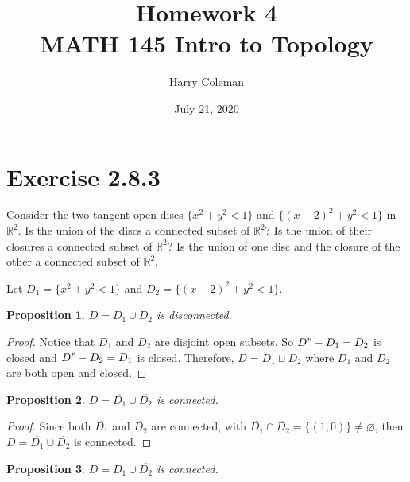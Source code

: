 \documentclass[12pt]{article}
\newtheorem{proposition}{Proposition}
\newenvironment{problem}
    {\begin{lrbox}{\mybox}\begin{minipage}{\textwidth-10pt}}
    {\end{minipage}\end{lrbox}\framebox[6.5in]{\usebox{\mybox}}}
\newcommand{\clo}[1]{\overline{#1}}
\newcommand{\R}{\mathbb{R}}
\let\emptyset\varnothing
\begin{document}
 
\title{Homework 4\\
    \large MATH 145 Intro to Topology
}
\author{Harry Coleman}
\date{July 21, 2020}
\maketitle

\section*{Exercise 2.8.3}
\begin{problem}
    Consider the two tangent open discs $\{x^2 + y^2 < 1\}$ and $\{(x-2)^2 + y^2 < 1\}$ in $\R^2$. Is the union of the discs a connected subset of $\R^2$? Is the union of their closures a connected subset of $\R^2$? Is the union of one disc and the closure of the other a connected subset of $\R^2$.
\end{problem}

Let $D_1 = \{x^2 + y^2 < 1\}$ and $D_2 = \{(x-2)^2 + y^2 < 1\}$.

\begin{proposition}
    $D = D_1\cup D_2$ is disconnected.
\end{proposition}

\begin{proof}
    Notice that $D_1$ and $D_2$ are disjoint open subsets. So $D"-D_1=D_2$ is closed and $D"-D_2 = D_1$ is closed. Therefore, $D=D_1\sqcup D_2$ where $D_1$ and $D_2$ are both open and closed.
    
\end{proof}

\begin{proposition}
    $D = \clo{D_1}\cup \clo{D_2}$ is connected.
\end{proposition}

\begin{proof}
    Since both $\clo{D_1}$ and $\clo{D_2}$ are connected, with $\clo{D_1}\cap\clo{D_2} = \{(1,0)\} \ne\emptyset$, then $D = \clo{D_1}\cup\clo{D_2}$ is connected.
    
\end{proof}

\begin{proposition}
    $D = D_1\cup \clo{D_2}$ is connected.
\end{proposition}
\end{document}
